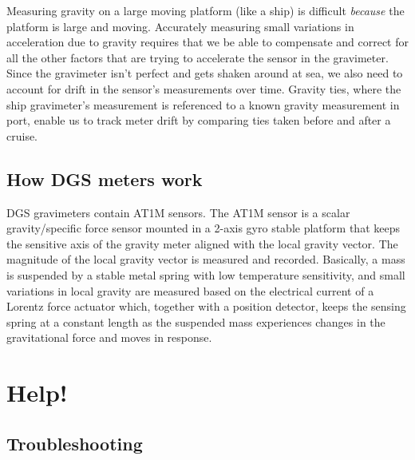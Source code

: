 \documentclass{pfpe-manual}
\begin{document}
Measuring gravity on a large moving platform (like a ship) is difficult \emph{because} the platform is large and moving. Accurately measuring small variations in acceleration due to gravity requires that we be able to compensate and correct for all the other factors that are trying to accelerate the sensor in the gravimeter. Since the gravimeter isn't perfect and gets shaken around at sea, we also need to account for drift in the sensor's measurements over time. Gravity ties, where the ship gravimeter's measurement is referenced to a known gravity measurement in port, enable us to track meter drift by comparing ties taken before and after a cruise. 

\subsection{How DGS meters work}
DGS gravimeters contain AT1M sensors. The AT1M sensor is a scalar gravity/specific force sensor mounted in a 2-axis gyro stable platform that keeps the sensitive axis of the gravity meter aligned with the local gravity vector. The magnitude of the local gravity vector is measured and recorded. Basically, a mass is suspended by a stable metal spring with low temperature sensitivity, and small variations in local gravity are measured based on the electrical current of a Lorentz force actuator which, together with a position detector, keeps the sensing spring at a constant length as the suspended mass experiences changes in the gravitational force and moves in response.

\section{Help!}
\label{helphelp}

\subsection{Troubleshooting}
\end{document}
